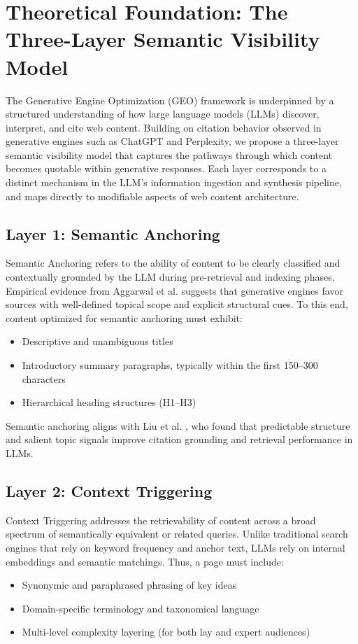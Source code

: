 \section{Theoretical Foundation: The Three-Layer Semantic Visibility Model}

The Generative Engine Optimization (GEO) framework is underpinned by a structured understanding of how large language models (LLMs) discover, interpret, and cite web content. Building on citation behavior observed in generative engines such as ChatGPT and Perplexity, we propose a three-layer semantic visibility model that captures the pathways through which content becomes quotable within generative responses. Each layer corresponds to a distinct mechanism in the LLM's information ingestion and synthesis pipeline, and maps directly to modifiable aspects of web content architecture.

\subsection{Layer 1: Semantic Anchoring}

Semantic Anchoring refers to the ability of content to be clearly classified and contextually grounded by the LLM during pre-retrieval and indexing phases. Empirical evidence from Aggarwal et al. \cite{aggarwal2024geo} suggests that generative engines favor sources with well-defined topical scope and explicit structural cues. To this end, content optimized for semantic anchoring must exhibit:
\begin{itemize}
  \item Descriptive and unambiguous titles
  \item Introductory summary paragraphs, typically within the first 150--300 characters
  \item Hierarchical heading structures (H1--H3)
\end{itemize}

Semantic anchoring aligns with Liu et al. \cite{liu2023verifiability}, who found that predictable structure and salient topic signals improve citation grounding and retrieval performance in LLMs.

\subsection{Layer 2: Context Triggering}

Context Triggering addresses the retrievability of content across a broad spectrum of semantically equivalent or related queries. Unlike traditional search engines that rely on keyword frequency and anchor text, LLMs rely on internal embeddings and semantic matchings. Thus, a page must include:
\begin{itemize}
  \item Synonymic and paraphrased phrasing of key ideas
  \item Domain-specific terminology and taxonomical language
  \item Multi-level complexity layering (for both lay and expert audiences)
\end{itemize}

